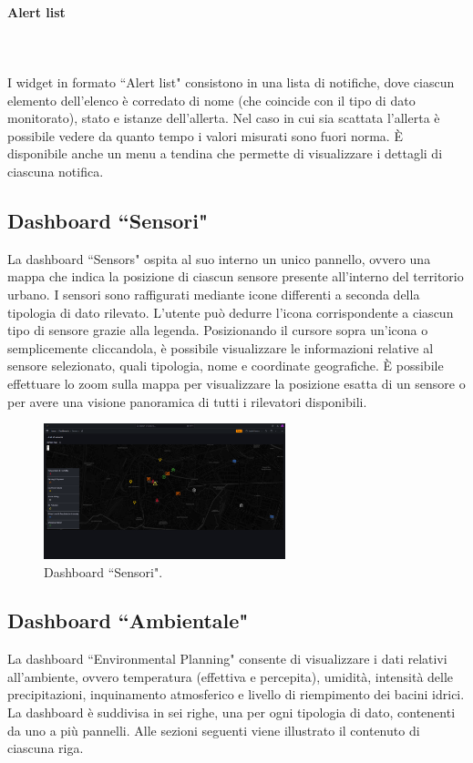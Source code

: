 \documentclass[8pt]{article}
\newcommand{\subsubsubsection}[1]{\paragraph{#1}\mbox{}\\\\}
\begin{document}
\subsubsubsection{Alert list}
I widget in formato ``Alert list" consistono in una lista di notifiche, dove ciascun elemento dell'elenco è corredato di nome (che coincide con il tipo di dato monitorato), stato e istanze dell'allerta. Nel caso in cui sia scattata l'allerta è possibile vedere da quanto tempo i valori misurati sono fuori norma. È disponibile anche un menu a tendina che permette di visualizzare i dettagli di ciascuna notifica.

\subsection{Dashboard ``Sensori"}
La dashboard ``Sensors" ospita al suo interno un unico pannello, ovvero una mappa che indica la posizione di ciascun sensore presente all'interno del territorio urbano. I sensori sono raffigurati mediante icone differenti a seconda della tipologia di dato rilevato. L'utente può dedurre l'icona corrispondente a ciascun tipo di sensore grazie alla legenda. Posizionando il cursore sopra un'icona o semplicemente cliccandola, è possibile visualizzare le informazioni relative al sensore selezionato, quali tipologia, nome e coordinate geografiche. È possibile effettuare lo zoom sulla mappa per visualizzare la posizione esatta di un sensore o per avere una visione panoramica di tutti i rilevatori disponibili.
\begin{figure}[H]
    \centering
    \includegraphics[width=7cm]{images_mu/sensors.png}
    \caption{Dashboard ``Sensori".}
    \label{fig:Dashboard ``Sensori"}
\end{figure}
\subsection{Dashboard ``Ambientale"}
La dashboard ``Environmental Planning" consente di visualizzare i dati relativi all'ambiente, ovvero temperatura (effettiva e percepita), umidità, intensità delle precipitazioni, inquinamento atmosferico e livello di riempimento dei bacini idrici. La dashboard è suddivisa in sei righe, una per ogni tipologia di dato, contenenti da uno a più pannelli. Alle sezioni seguenti viene illustrato il contenuto di ciascuna riga.
\end{document}
